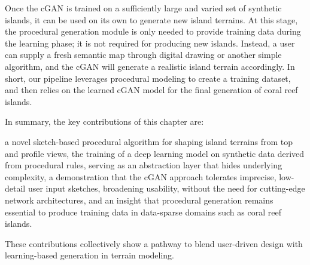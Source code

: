 Once the cGAN is trained on a sufficiently large and varied set of synthetic islands, it can be used on its own to generate new island terrains. At this stage, the procedural generation module is only needed to provide training data during the learning phase; it is not required for producing new islands. Instead, a user can supply a fresh semantic map through digital drawing or another simple algorithm, and the cGAN will generate a realistic island terrain accordingly. In short, our pipeline leverages procedural modeling to create a training dataset, and then relies on the learned cGAN model for the final generation of coral reef islands.


In summary, the key contributions of this chapter are:
\begin{Itemize}
    \Item{} a novel sketch-based procedural algorithm for shaping island terrains from top and profile views,
    \Item{} the training of a deep learning model on synthetic data derived from procedural rules, serving as an abstraction layer that hides underlying complexity,
    \Item{} a demonstration that the cGAN approach tolerates imprecise, low-detail user input sketches, broadening usability, without the need for cutting-edge network architectures, 
    \Item{} and an insight that procedural generation remains essential to produce training data in data-sparse domains such as coral reef islands.
\end{Itemize}
These contributions collectively show a pathway to blend user-driven design with learning-based generation in terrain modeling.














